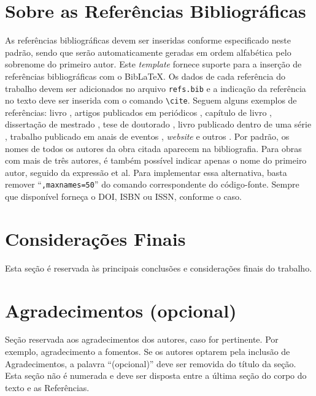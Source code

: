 \documentclass{pssbmac}
\begin{document}
\section{Sobre as Referências Bibliográficas}

As referências bibliográficas devem ser inseridas conforme especificado neste padrão, 
sendo que serão automaticamente geradas em ordem alfabética pelo sobrenome do primeiro autor. 
Este {\it template} fornece suporte para a inserção de referências bibliográficas com o Bib\LaTeX{}. 
Os dados de cada referência do trabalho devem ser adicionados no arquivo \verb+refs.bib+ e a
 indicação da referência no texto deve ser inserida com o comando \verb+\cite+. 
 Seguem alguns exemplos de referências: livro \cite{Boldrini}, artigos publicados em periódicos 
 \cite{Contiero,Cuminato}, capítulo de livro \cite{daSilva}, dissertação de mestrado \cite{Diniz}, 
 tese de doutorado \cite{Mallet}, livro publicado dentro de uma série \cite{Gomes}, 
 trabalho publicado em anais de eventos \cite{Santos}, {\it website} e outros \cite{CNMAC}. 
 Por padrão, os nomes de todos os autores da obra citada aparecem na bibliografia. 
 Para obras com mais de três autores, é também possível indicar apenas o nome do primeiro autor, 
 seguido da expressão et al. Para implementar essa alternativa, basta remover ``\verb+,maxnames=50+'' 
 do comando correspondente do código-fonte. Sempre que disponível forneça o DOI, ISBN ou ISSN, conforme o caso.

\section{Considerações Finais}

Esta seção é reservada às principais conclusões e considerações finais do trabalho.

\section*{Agradecimentos (opcional)}

Seção reservada aos agradecimentos dos autores, caso for pertinente. Por exemplo, agradecimento a fomentos. Se os autores optarem pela inclusão de Agradecimentos, a palavra ``(opcional)'' deve ser removida do título da seção. Esta seção não é numerada e deve ser disposta entre a última seção do corpo do texto e as Referências.


\printbibliography
\end{document}
